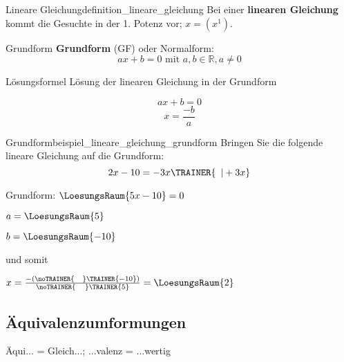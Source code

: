 \begin{definition}{Lineare Gleichung}{definition_lineare_gleichung}
  Bei einer \textbf{linearen Gleichung} kommt die Gesuchte in der
  1. Potenz vor; \zB $x = (x^1)$.
\end{definition}

\begin{definition}{Grundform}{}
  \textbf{Grundform} (GF) oder Normalform:\\
  $$ax+b=0 \textrm{ mit } a,b\in\mathbb{R}, a\ne 0$$
  
  \end{definition}

\begin{gesetz}{Lösungsformel}{}
 Lösung der linearen Gleichung in der Grundform

 $$ax+b=0$$
 \noTRAINER{\vspace{3cm}}
  $$x = \frac{-b}a$$
  
\end{gesetz}

\begin{beispiel}{Grundform}{beispiel_lineare_gleichung_grundform}
  Bringen Sie die folgende lineare Gleichung auf die Grundform:
  $$2x-10 = -3x\TRAINER{\,\,\,| +3x}$$

  Grundform: $\LoesungsRaum{5x-10} = 0$

  $a = \LoesungsRaum{5}$

  $b = \LoesungsRaum{-10}$

  und somit

  \LARGE{$x=\frac{-(\noTRAINER{\,\,\,\,\,\,}\TRAINER{-10})}{\noTRAINER{\,\,\,\,\,\,\,}\TRAINER{5}}
    = \LoesungsRaum{2}$}

\end{beispiel}


\TALS{}
  
\newpage
\subsection{Äquivalenzumformungen}
Äqui... = Gleich...; ...valenz = ...wertig



